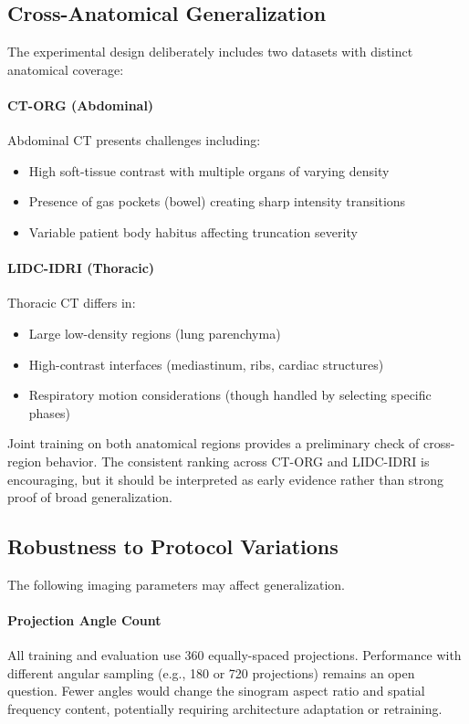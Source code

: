 \subsection{Cross-Anatomical Generalization}

The experimental design deliberately includes two datasets with distinct anatomical coverage:

\paragraph{CT-ORG (Abdominal)}
Abdominal CT presents challenges including:
\begin{itemize}
    \item High soft-tissue contrast with multiple organs of varying density
    \item Presence of gas pockets (bowel) creating sharp intensity transitions
    \item Variable patient body habitus affecting truncation severity
\end{itemize}

\paragraph{LIDC-IDRI (Thoracic)}
Thoracic CT differs in:
\begin{itemize}
    \item Large low-density regions (lung parenchyma)
    \item High-contrast interfaces (mediastinum, ribs, cardiac structures)
    \item Respiratory motion considerations (though handled by selecting specific phases)
\end{itemize}

Joint training on both anatomical regions provides a preliminary check of cross-region behavior. The consistent ranking across CT-ORG and LIDC-IDRI is encouraging, but it should be interpreted as early evidence rather than strong proof of broad generalization.

\subsection{Robustness to Protocol Variations}

The following imaging parameters may affect generalization.

\paragraph{Projection Angle Count} 
All training and evaluation use 360 equally-spaced projections. Performance with different angular sampling (e.g., 180 or 720 projections) remains an open question. Fewer angles would change the sinogram aspect ratio and spatial frequency content, potentially requiring architecture adaptation or retraining.

